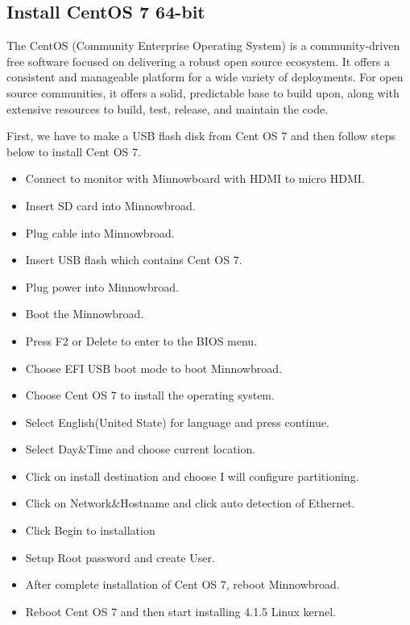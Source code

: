 \documentclass[10pt,draftclsnofoot,journal,compsoc,onecolumn]{IEEEtran}
\begin{document}
\subsection{Install CentOS 7 64-bit}
	The CentOS (Community Enterprise Operating System) is a community-driven free software focused on delivering a robust open source ecosystem. It offers a consistent and manageable platform for a wide variety of deployments. For open source communities, it offers a solid, predictable base to build upon, along with extensive resources to build, test, release, and maintain the code.

\par First, we have to make a USB flash disk from Cent OS 7 and then follow steps below to install Cent OS 7.
\begin{itemize}    
\item Connect to monitor with Minnowboard with HDMI to micro HDMI.
\item Insert SD card into Minnowbroad.
\item Plug cable into Minnowbroad.
\item Insert USB flash which contains Cent OS 7.
\item Plug power into Minnowbroad.
\item Boot the Minnowbroad.
\item Press F2 or Delete to enter to the BIOS menu.
\item Choose EFI USB boot mode to boot Minnowbroad.
\item Choose Cent OS 7 to install the operating system.
\item Select English(United State) for language and press continue.
\item Select Day\&Time and choose current location.
\item Click on install destination and choose I will configure partitioning.
\item Click on Network\&Hostname and click auto detection of Ethernet.
\item Click Begin to installation
\item Setup Root password and create User.
\item After complete installation of Cent OS 7, reboot Minnowbroad.
\item Reboot Cent OS 7 and then start installing 4.1.5 Linux kernel.

\end{itemize}
\end{document}
